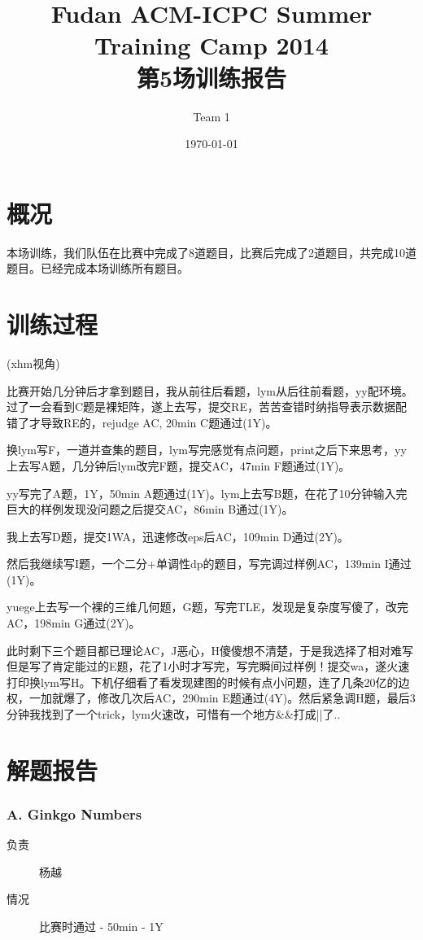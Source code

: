 \documentclass[a4paper, 11pt, nofonts, nocap, fancyhdr]{ctexart}
\title{Fudan ACM-ICPC Summer Training Camp 2014\\第5场训练报告}
\author{Team 1}
\date{\today}
\newcommand{\problem}[1]{\subsubsection{#1}}
\begin{document}
\maketitle

\section{概况}

本场训练，我们队伍在比赛中完成了8道题目，比赛后完成了2道题目，共完成10道题目。已经完成本场训练所有题目。

\section{训练过程}

(xhm视角)

比赛开始几分钟后才拿到题目，我从前往后看题，lym从后往前看题，yy配环境。过了一会看到C题是裸矩阵，遂上去写，提交RE，苦苦查错时纳指导表示数据配错了才导致RE的，rejudge AC, 20min C题通过(1Y)。

换lym写F，一道并查集的题目，lym写完感觉有点问题，print之后下来思考，yy上去写A题，几分钟后lym改完F题，提交AC，47min F题通过(1Y)。

yy写完了A题，1Y，50min A题通过(1Y)。lym上去写B题，在花了10分钟输入完巨大的样例发现没问题之后提交AC，86min B通过(1Y)。

我上去写D题，提交1WA，迅速修改eps后AC，109min D通过(2Y)。

然后我继续写I题，一个二分+单调性dp的题目，写完调过样例AC，139min I通过(1Y)。

yuege上去写一个裸的三维几何题，G题，写完TLE，发现是复杂度写傻了，改完AC，198min G通过(2Y)。

此时剩下三个题目都已理论AC，J恶心，H傻傻想不清楚，于是我选择了相对难写但是写了肯定能过的E题，花了1小时才写完，写完瞬间过样例！提交wa，遂火速打印换lym写H。下机仔细看了看发现建图的时候有点小问题，连了几条20亿的边权，一加就爆了，修改几次后AC，290min E题通过(4Y)。然后紧急调H题，最后3分钟我找到了一个trick，lym火速改，可惜有一个地方\&\&打成||了..


\section{解题报告}

\problem{A. Ginkgo Numbers}

\begin{description}
\item[负责] 杨越
\item[情况] 比赛时通过 - 50min - 1Y
\end{description}
\end{document}
